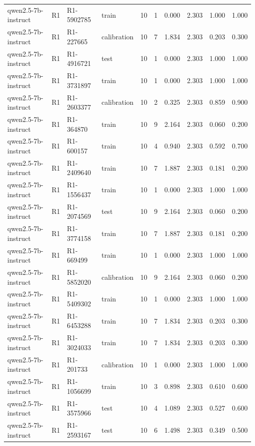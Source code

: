 \begin{table}
\begin{tabular}{llllrrrrrr}
qwen2.5-7b-instruct & R1 & R1-5902785 & train & 10 & 1 & 0.000 & 2.303 & 1.000 & 1.000 \\
qwen2.5-7b-instruct & R1 & R1-227665 & calibration & 10 & 7 & 1.834 & 2.303 & 0.203 & 0.300 \\
qwen2.5-7b-instruct & R1 & R1-4916721 & test & 10 & 1 & 0.000 & 2.303 & 1.000 & 1.000 \\
qwen2.5-7b-instruct & R1 & R1-3731897 & train & 10 & 1 & 0.000 & 2.303 & 1.000 & 1.000 \\
qwen2.5-7b-instruct & R1 & R1-2603377 & calibration & 10 & 2 & 0.325 & 2.303 & 0.859 & 0.900 \\
qwen2.5-7b-instruct & R1 & R1-364870 & train & 10 & 9 & 2.164 & 2.303 & 0.060 & 0.200 \\
qwen2.5-7b-instruct & R1 & R1-600157 & train & 10 & 4 & 0.940 & 2.303 & 0.592 & 0.700 \\
qwen2.5-7b-instruct & R1 & R1-2409640 & train & 10 & 7 & 1.887 & 2.303 & 0.181 & 0.200 \\
qwen2.5-7b-instruct & R1 & R1-1556437 & train & 10 & 1 & 0.000 & 2.303 & 1.000 & 1.000 \\
qwen2.5-7b-instruct & R1 & R1-2074569 & test & 10 & 9 & 2.164 & 2.303 & 0.060 & 0.200 \\
qwen2.5-7b-instruct & R1 & R1-3774158 & train & 10 & 7 & 1.887 & 2.303 & 0.181 & 0.200 \\
qwen2.5-7b-instruct & R1 & R1-669499 & train & 10 & 1 & 0.000 & 2.303 & 1.000 & 1.000 \\
qwen2.5-7b-instruct & R1 & R1-5852020 & calibration & 10 & 9 & 2.164 & 2.303 & 0.060 & 0.200 \\
qwen2.5-7b-instruct & R1 & R1-5409302 & train & 10 & 1 & 0.000 & 2.303 & 1.000 & 1.000 \\
qwen2.5-7b-instruct & R1 & R1-6453288 & train & 10 & 7 & 1.834 & 2.303 & 0.203 & 0.300 \\
qwen2.5-7b-instruct & R1 & R1-3024033 & train & 10 & 7 & 1.834 & 2.303 & 0.203 & 0.300 \\
qwen2.5-7b-instruct & R1 & R1-201733 & calibration & 10 & 1 & 0.000 & 2.303 & 1.000 & 1.000 \\
qwen2.5-7b-instruct & R1 & R1-1056699 & train & 10 & 3 & 0.898 & 2.303 & 0.610 & 0.600 \\
qwen2.5-7b-instruct & R1 & R1-3575966 & test & 10 & 4 & 1.089 & 2.303 & 0.527 & 0.600 \\
qwen2.5-7b-instruct & R1 & R1-2593167 & test & 10 & 6 & 1.498 & 2.303 & 0.349 & 0.500 \\

\end{tabular}
\end{table}
